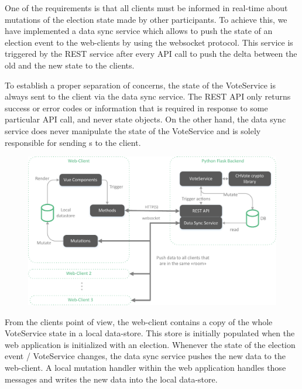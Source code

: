 One of the requirements is that all clients must be informed in real-time about mutations of the election state made by other participants. To achieve this, we have implemented a data sync service which allows to push the state of an election event to the web-clients by using the websocket protocol. This service is triggered by the REST service after every API call to push the delta between the old and the new state to the clients.

To establish a proper separation of concerns, the state of the VoteService is always sent to the client via the data sync service. The REST API only returns success or error codes or information that is required in response to some particular API call, and never state objects. On the other hand, the data sync service does never manipulate the state of the VoteService and is solely responsible for sending s to the client.

\begin{figure}[h!]
\begin{center}
\includegraphics[scale=0.7]{assets/chvoteArchitecture.pdf}
\label{Architecture}%
\end{center}
\end{figure}

From the clients point of view, the web-client contains a copy of the whole VoteService state in a local data-store. This store is initially populated when the web application is initialized with an election. Whenever the state of the election event / VoteService changes, the data sync service pushes the new data to the web-client. A local mutation handler within the web application handles those messages and writes the new data into the local data-store.

